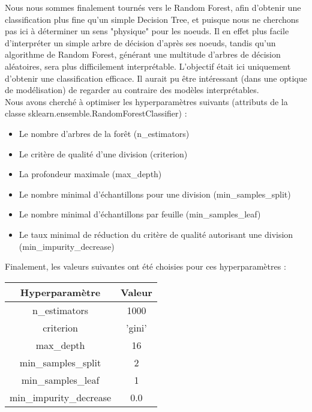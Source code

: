 \documentclass{article}
\begin{document}
Nous nous sommes finalement tournés vers le Random Forest, afin d'obtenir une classification plus fine qu'un simple Decision Tree, et puisque nous ne cherchons pas ici à déterminer un sens "physique" pour les noeuds. Il en effet plus facile d'interpréter un simple arbre de décision d'après ses noeuds, tandis qu'un algorithme de Random Forest, générant une multitude d'arbres de décision aléatoires, sera plus difficilement interprétable. L'objectif était ici uniquement d'obtenir une classification efficace. Il aurait pu être intéressant (dans une optique de modélisation) de regarder au contraire des modèles interprétables.
\\

Nous avons cherché à optimiser les hyperparamètres suivants (attributs de la classe sklearn.ensemble.RandomForestClassifier) :
\\

\begin{itemize}
\item Le nombre d'arbres de la forêt (n\_estimators)
\item Le critère de qualité d'une division (criterion)
\item La profondeur maximale (max\_depth)
\item Le nombre minimal d'échantillons pour une division (min\_samples\_split)
\item Le nombre minimal d'échantillons par feuille (min\_samples\_leaf)
\item Le taux minimal de réduction du critère de qualité autorisant une division (min\_impurity\_decrease)
\end{itemize}
\vspace{0.5cm}



Finalement, les valeurs suivantes ont été choisies pour ces hyperparamètres :
\\

\begin{center}
 \begin{tabular}{|c|c|}
			 \hline
			 \textbf{Hyperparamètre} & \textbf{Valeur} \\
			 \hline
			 n\_estimators & 1000  \\
			 \hline
			 criterion & 'gini' \\
			 \hline
			 max\_depth & 16  \\
			 \hline
			 min\_samples\_split & 2 \\
			 \hline
			 min\_samples\_leaf & 1  \\
			 \hline
			 min\_impurity\_decrease & 0.0  \\
			 \hline
 \end{tabular}
\end{center}
\end{document}
